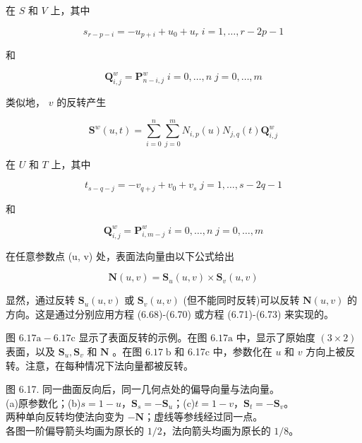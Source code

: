 \documentclass[../main.tex]{subfiles}
\begin{document}
在 \(S\) 和 \(V\) 上，其中

\[
{s}_{r - p - i} =  - {u}_{p + i} + {u}_{0} + {u}_{r}\;i = 1,\ldots ,r - {2p} - 1 \tag{6.69}
\]

和

\[
{\mathbf{Q}}_{i,j}^{w} = {\mathbf{P}}_{n - i,j}^{w}\;i = 0,\ldots ,n\;j = 0,\ldots ,m \tag{6.70}
\]

类似地， \(v\) 的反转产生

\[
{\mathbf{S}}^{w}\left( {u,t}\right)  = \mathop{\sum }\limits_{{i = 0}}^{n}\mathop{\sum }\limits_{{j = 0}}^{m}{N}_{i,p}\left( u\right) {N}_{j,q}\left( t\right) {\mathbf{Q}}_{i,j}^{w} \tag{6.71}
\]

在 \(U\) 和 \(T\) 上，其中

\[
{t}_{s - q - j} =  - {v}_{q + j} + {v}_{0} + {v}_{s}\;j = 1,\ldots ,s - {2q} - 1 \tag{6.72}
\]

和

\[
{\mathbf{Q}}_{i,j}^{w} = {\mathbf{P}}_{i,m - j}^{w}\;i = 0,\ldots ,n\;j = 0,\ldots ,m \tag{6.73}
\]



在任意参数点 (u, v) 处，表面法向量由以下公式给出

\[
\mathbf{N}\left( {u,v}\right)  = {\mathbf{S}}_{u}\left( {u,v}\right)  \times  {\mathbf{S}}_{v}\left( {u,v}\right)  \tag{6.74}
\]

显然，通过反转 \({\mathbf{S}}_{u}\left( {u,v}\right)\) 或 \({\mathbf{S}}_{v}\left( {u,v}\right)\) (但不能同时反转)可以反转 \(\mathbf{N}\left( {u,v}\right)\) 的方向。这是通过分别应用方程 (6.68)-(6.70) 或方程 (6.71)-(6.73) 来实现的。

图 \({6.17}\mathrm{a} - {6.17}\mathrm{c}\) 显示了表面反转的示例。在图 \({6.17}\mathrm{a}\) 中，显示了原始度 \(\left( {3 \times  2}\right)\) 表面，以及 \({\mathbf{S}}_{u},{\mathbf{S}}_{v}\) 和 \(\mathbf{N}\) 。在图 \({6.17}\mathrm{\;b}\) 和 6.17c 中，参数化在 \(u\) 和 \(v\) 方向上被反转。注意，在每种情况下法向量都被反转。



\begin{center}
\begin{minipage}{28cm}
\vspace*{.6\baselineskip}
\centering
{}
\par\vspace{.7\baselineskip}
\par\smallskip
图 6.17. 同一曲面反向后，同一几何点处的偏导向量与法向量。\\
(a)原参数化；(b)$s=1-u$，$\mathbf S_s=-\mathbf S_u$；(c)$t=1-v$，$\mathbf S_t=-\mathbf S_v$。\\
两种单向反转均使法向变为 $-\mathbf N$；虚线等参线经过同一点。\\
各图一阶偏导箭头均画为原长的 $1/2$，法向箭头均画为原长的 $1/8$。
\end{minipage}
\end{center}
\end{document}
